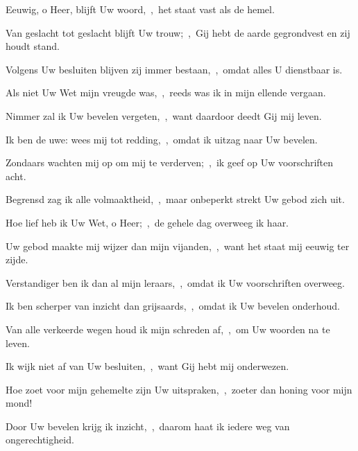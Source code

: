 \documentclass[12pt,twoside,a5paper]{article}
\begin{document}

\begin{halfparskip}
  Eeuwig, o Heer, blijft Uw woord,~\sep\ het staat vast als de hemel.


  Van geslacht tot geslacht blijft Uw trouw;~\sep\ Gij hebt de aarde gegrondvest en zij houdt stand.

  Volgens Uw besluiten blijven zij immer bestaan,~\sep\ omdat alles U dienstbaar is.

  Als niet Uw Wet mijn vreugde was,~\sep\ reeds was ik in mijn ellende vergaan.

  Nimmer zal ik Uw bevelen vergeten,~\sep\ want daardoor deedt Gij mij leven.

  Ik ben de uwe: wees mij tot redding,~\sep\ omdat ik uitzag naar Uw bevelen.

  Zondaars wachten mij op om mij te verderven;~\sep\ ik geef op Uw voorschriften acht.

  Begrensd zag ik alle volmaaktheid,~\sep\ maar onbeperkt strekt Uw gebod zich uit.

  Hoe lief heb ik Uw Wet, o Heer;~\sep\ de gehele dag overweeg ik haar.

  Uw gebod maakte mij wijzer dan mijn vijanden,~\sep\ want het staat mij eeuwig ter zijde.

  Verstandiger ben ik dan al mijn leraars,~\sep\ omdat ik Uw voorschriften overweeg.

  Ik ben scherper van inzicht dan grijsaards,~\sep\ omdat ik Uw bevelen onderhoud.

  Van alle verkeerde wegen houd ik mijn schreden af,~\sep\ om Uw woorden na te leven.

  Ik wijk niet af van Uw besluiten,~\sep\ want Gij hebt mij onderwezen.

  Hoe zoet voor mijn gehemelte zijn Uw uitspraken,~\sep\ zoeter dan honing voor mijn mond!

  Door Uw bevelen krijg ik inzicht,~\sep\ daarom haat ik iedere weg van ongerechtigheid.
\end{halfparskip}

\end{document}
